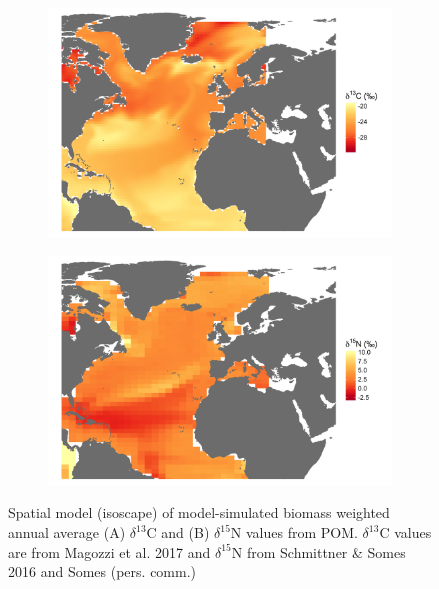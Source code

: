 \documentclass[a4paper,12pt]{article}
\begin{document}
\begin{figure}[!htbp]
    \centering
    \begin{subfigure}[t]{0.45\textwidth}
        \centering
        \includegraphics[width=\linewidth]{figures/Figure-S3-plankton-d13C-map.png} 
    \end{subfigure}
    \hfill
    \begin{subfigure}[t]{0.45\textwidth}
        \centering
        \includegraphics[width=\linewidth]{figures/Figure-S3-plankton-d15N-map.png} 
    \end{subfigure}
    \caption{Spatial model (isoscape) of model-simulated biomass weighted annual average (A) $\delta^{13}$C and (B) $\delta^{15}$N values from POM. $\delta^{13}$C values are from Magozzi et al. 2017\cite{magozzi2017using} and $\delta^{15}$N from Schmittner \& Somes 2016\cite{schmittner2016complementary} and Somes (pers. comm.)} 
    \label{figs3}
\end{figure}
\end{document}
